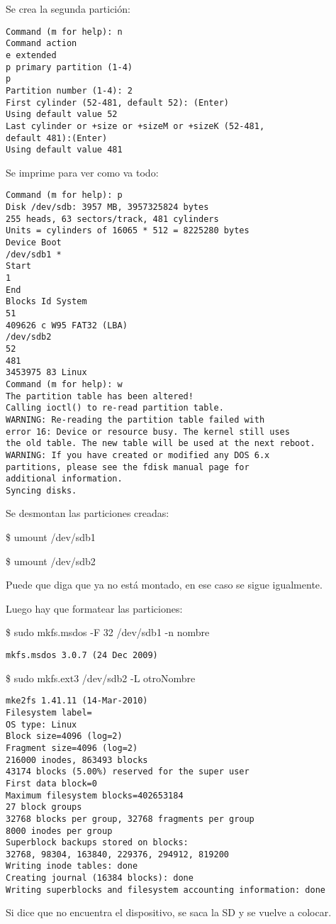 Se crea la segunda partición: 

\begin{verbatim}
Command (m for help): n 
Command action 
e extended 
p primary partition (1-4) 
p 
Partition number (1-4): 2 
First cylinder (52-481, default 52): (Enter) 
Using default value 52 
Last cylinder or +size or +sizeM or +sizeK (52-481, 
default 481):(Enter) 
Using default value 481 
\end{verbatim}

Se imprime para ver como va todo: 

\begin{verbatim}
Command (m for help): p 
Disk /dev/sdb: 3957 MB, 3957325824 bytes 
255 heads, 63 sectors/track, 481 cylinders 
Units = cylinders of 16065 * 512 = 8225280 bytes 
Device Boot 
/dev/sdb1 * 
Start 
1 
End 
Blocks Id System 
51 
409626 c W95 FAT32 (LBA) 
/dev/sdb2 
52 
481 
3453975 83 Linux 
Command (m for help): w 
The partition table has been altered! 
Calling ioctl() to re-read partition table. 
WARNING: Re-reading the partition table failed with 
error 16: Device or resource busy. The kernel still uses 
the old table. The new table will be used at the next reboot. 
WARNING: If you have created or modified any DOS 6.x 
partitions, please see the fdisk manual page for 
additional information. 
Syncing disks. 
\end{verbatim}

Se desmontan las particiones creadas: 

\bigskip
\centerline{\$ umount /dev/sdb1}

\centerline{\$ umount /dev/sdb2}

\bigskip
Puede que diga que ya no está montado, en ese caso se sigue igualmente. 

\bigskip
Luego hay que formatear las particiones: 

\bigskip
\centerline{\$ sudo mkfs.msdos -F 32 /dev/sdb1 -n nombre}

\begin{verbatim}
mkfs.msdos 3.0.7 (24 Dec 2009) 
\end{verbatim}

\centerline{\$ sudo mkfs.ext3 /dev/sdb2 -L otroNombre}
\begin{verbatim}
mke2fs 1.41.11 (14-Mar-2010) 
Filesystem label= 
OS type: Linux 
Block size=4096 (log=2) 
Fragment size=4096 (log=2) 
216000 inodes, 863493 blocks 
43174 blocks (5.00%) reserved for the super user 
First data block=0 
Maximum filesystem blocks=402653184 
27 block groups 
32768 blocks per group, 32768 fragments per group 
8000 inodes per group 
Superblock backups stored on blocks: 
32768, 98304, 163840, 229376, 294912, 819200 
Writing inode tables: done 
Creating journal (16384 blocks): done 
Writing superblocks and filesystem accounting information: done
\end{verbatim}

\bigskip
Si dice que no encuentra el dispositivo, se saca la SD y se vuelve a colocar.
